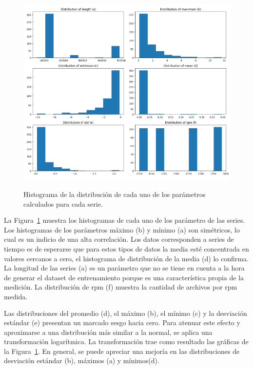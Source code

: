 \documentclass[11pt,a4paper,spanish]{book}
\numberwithin{equation}{chapter}
\numberwithin{figure}{chapter}
\begin{document}
\begin{figure}[h]
    \caption{Histograma de la distribución de cada uno de los parámetros calculados para cada serie. }
    \centering
    \includegraphics[width=1\textwidth]{media/dataset/histogram-01.png}
    \label{fig:figHistogram01}
\end{figure}


La Figura~\ref{fig:figHistogram01} muestra los histogramas de cada uno de los parámetro 
de las series. Los histogramas de los parámetros máximo (b) y mínimo (a) son simétricos, 
lo cual es un indicio de una alta correlación. Los datos corresponden a series de 
tiempo es de esperarse que para estos tipos de datos la media esté concentrada en 
valores cercanos a cero, el histograma de distribución de la media (d) lo confirma. 
La longitud de las series (a) es un parámetro que no se tiene en cuenta a la hora de 
generar el dataset de entrenamiento porque es una característica propia de la medición. 
La distribución de rpm (f) muestra la cantidad de archivos por rpm medida.    


Las distribuciones del promedio (d), el máximo (b), el mínimo (c) y la desviación 
estándar (e) presentan un marcado sesgo hacia cero. Para atenuar este efecto y 
aproximarse a una distribución más similar a la normal, se aplica una transformación 
logarítmica. La transformación trae como resultado las gráficas de la 
Figura~\ref{fig:figHistogram01}. En general, se puede apreciar una mejoría en las 
distribuciones de desviación estándar (b), máximos (a) y mínimos(d). 
\end{document}
